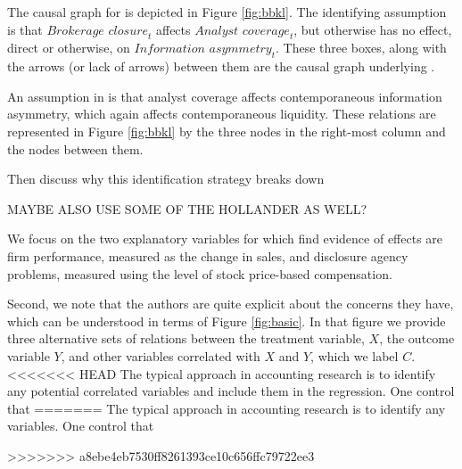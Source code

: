 \documentclass[11pt]{amsart}
\begin{document}
The causal graph for \citet{Kelly:2012ih} is depicted in Figure \ref{fig:bbkl}.
The identifying assumption is that $\textit{Brokerage closure}_t$ affects $\textit{Analyst coverage}_t$, but otherwise has no effect, direct or otherwise, on $\textit{Information asymmetry}_t$.
These three boxes, along with the arrows (or lack of arrows) between them are the causal graph underlying \citet{Kelly:2012ih}.

An assumption in \citet{Kelly:2012ih} is that analyst coverage affects contemporaneous information asymmetry, which again affects contemporaneous liquidity.
These relations are represented in Figure \ref{fig:bbkl} by the three nodes in the right-most column and the nodes between them.

Then discuss why this identification strategy  breaks down


MAYBE ALSO USE SOME OF THE HOLLANDER AS WELL?


We focus on the two explanatory variables for which \citet{Hollander:2010jg} find evidence of effects are firm performance, measured as the change in sales, and disclosure agency problems, measured using the level of stock price-based compensation.



Second, we note that the authors are quite explicit about the concerns they have, which can be understood in terms of Figure \ref{fig:basic}.
In that figure we provide three alternative sets of relations between the treatment variable, $X$, the outcome variable $Y$, and other variables correlated with $X$ and $Y$, which we label $C$.
<<<<<<< HEAD
The typical approach in accounting research is to identify any potential correlated variables and include them in the regression.
One control that 
=======
The typical approach in accounting research is to identify any variables.
One control that %



>>>>>>> a8ebe4eb7530ff8261393ce10c656ffc79722ee3





%
\end{document}
